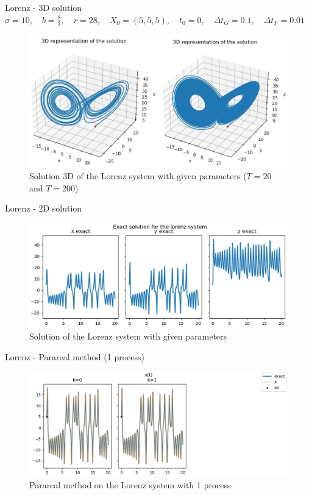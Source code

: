 \begin{frame}{Lorenz - 3D solution}
	$\sigma=10, \quad b=\frac{8}{3}, \quad r=28, \quad X_0=(5,5,5), \quad t_0=0, \quad \Delta t_G=0.1, \quad \Delta t_F=0.01$
	\begin{figure}
		\centering
		\includegraphics[width=0.7\linewidth]{"images/parareal/lorenz_sol3D.jpg"}
		\caption{Solution 3D of the Lorenz system with given parameters ($T=20$ and $T=200$)}
	\end{figure}

	\end{frame}
	\begin{frame}{Lorenz - 2D solution}

	\begin{minipage}{\linewidth}
	\begin{figure} 
		\centering     
		\includegraphics[width=\linewidth]{"images/parareal/lorenz_exact.jpg"}
		\caption{Solution of the Lorenz system with given parameters}
	\end{figure}
	\end{minipage}

	\end{frame}
	\begin{frame}{Lorenz - Parareal method (1 process)}
	
	\begin{minipage}{\linewidth}
	\begin{figure}
		\centering       
		\includegraphics[width=0.9\linewidth]{"images/parareal/lorenz_1p.jpg"}
		\caption{Parareal method on the Lorenz system with 1 process}
	\end{figure}
	\end{minipage}

	\end{frame}
